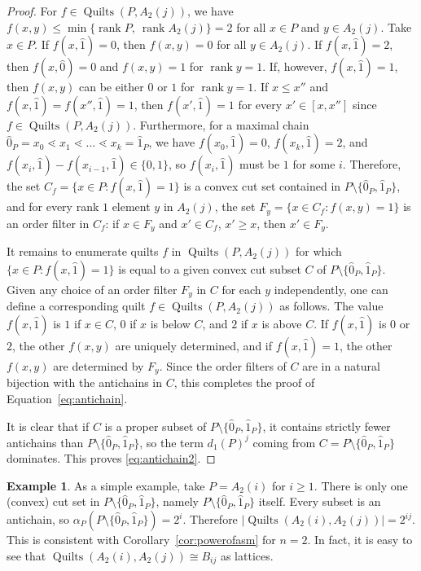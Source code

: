 \documentclass[12pt]{amsart}
\numberwithin{equation}{section}
\theoremstyle{definition}
\newtheorem{example}[theorem]{Example}
\newcommand{\quilt}{\operatorname{Quilts}}
\newcommand{\rank}{\operatorname{rank}}
\begin{document}
\begin{proof}
 For $f \in \quilt(P,A_2(j))$, we have $f(x,y) \leq \min\{\rank
P,\ \rank A_2(j)\} = 2$ for all $x \in P$ and $y \in A_2(j)$. Take $x
\in P$. If $f(x,\hat 1) = 0$, then $f(x,y) = 0$ for all $y \in
A_2(j)$. If $f(x,\hat 1) = 2$, then $f(x,\hat 0) = 0$ and $f(x,y) = 1$
for $\rank y = 1$. If, however, $f(x, \hat 1) = 1$, then $f(x,y)$ can
be either $0$ or $1$ for $\rank y = 1$.  If $x \leq x''$ and $f(x,
\hat 1) = f(x'', \hat 1) = 1$, then $f(x', \hat 1) = 1$ for every $x'
\in [x,x'']$ since $f \in \quilt(P,A_2(j))$.  Furthermore, for a
maximal chain $\hat 0_P = x_0 \lessdot x_1 \lessdot \dots \lessdot x_k
= \hat 1_P$, we have $f(x_0,\hat 1) = 0$, $f(x_k,\hat 1) = 2$, and
$f(x_i,\hat 1) - f(x_{i-1},\hat 1) \in \{0,1\}$, so $f(x_i,\hat 1)$
must be $1$ for some $i$.  Therefore, the set $C_{f}=\{ x \in P \colon
f(x, \hat 1) = 1\}$ is a convex cut set contained in $P \setminus
\{\hat 0_P, \hat 1_P\}$, and for every rank $1$ element $y$ in
$A_2(j)$, the set $F_y = \{x \in C_{f} \colon f(x,y) = 1\}$ is an
order filter in $C_{f}$: if $x \in F_y$ and $x' \in C_f$, $x' \geq x$,
then $x' \in F_y$.

It remains to enumerate quilts $f$ in $\quilt(P,A_2(j))$ for which $\{
x \in P \colon f(x, \hat 1) = 1\}$ is equal to a given convex cut
subset $C$ of $P \setminus \{\hat 0_P, \hat 1_P\}$.  Given any choice
of an order filter $F_y$ in $C$ for each $y$ independently, one can
define a corresponding quilt $f \in \quilt(P,A_2(j))$ as follows. The
value $f(x,\hat 1)$ is $1$ if $x \in C$, $0$ if $x$ is below $C$, and
$2$ if $x$ is above $C$.  If $f(x,\hat 1)$ is $0$
or $2$, the other $f(x,y)$ are uniquely determined, and if $f(x,\hat
1) = 1$, the other $f(x,y)$ are determined by $F_y$. Since the order
filters of $C$ are in a natural bijection with the antichains in $C$,
this completes the proof of Equation~\eqref{eq:antichain}.



It is clear that if $C$ is a proper subset of $P \setminus \{\hat
0_P,\hat 1_P\}$, it contains strictly fewer antichains than $P
\setminus \{\hat 0_P,\hat 1_P\}$, so the term $d_1(P)^j$ coming from
$C = P \setminus \{\hat 0_P,\hat 1_P\}$ dominates.  This proves
\eqref{eq:antichain2}.
\end{proof}


\begin{example}\label{example:cut.set}
As a simple example, take $P = A_2(i)$ for $i \geq 1$. There is only
one (convex) cut set in $P \setminus \{\hat 0_P,\hat 1_P\}$, namely $P \setminus \{\hat 0_P,\hat 1_P\}$ itself. Every subset is an antichain, so $\alpha_P(P \setminus \{\hat 0_P,\hat 1_P\}) = 2^i$. Therefore $|\quilt(A_2(i),A_2(j))| = 2^{ij}$. This is consistent with Corollary~\ref{cor:powerofasm} for $n = 2$. In fact, it is easy to see that $\quilt(A_2(i),A_2(j)) \cong B_{ij}$ as lattices.
\end{example}
\end{document}
